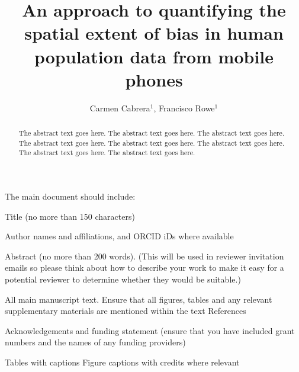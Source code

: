 \documentclass[]{rsos}%
\begin{document}
\title{An approach to quantifying the spatial extent of bias in human population data from mobile phones}

\author{
Carmen Cabrera$^{1}$,
Francisco Rowe$^{1}$}

\address{
  $^{1}$Geographic Data Science Lab, Department of Geography and Planning, University of Liverpool, Liverpool, United Kingdom.\\
  $^{}$}
\subject{
subject 1,
subject 2,
subject 3}



\begin{abstract}
The abstract text goes here. The abstract text goes here. The abstract text goes here. The abstract text goes here. The abstract text goes here. The abstract text goes here. The abstract text goes here. The abstract text goes here.
\end{abstract}

\providecommand{\EndFirstPage}{%
}

\maketitle

The main document should include:

Title (no more than 150 characters)

Author names and affiliations, and ORCID iDs where available

Abstract (no more than 200 words). (This will be used in reviewer
invitation emails so please think about how to describe your work to
make it easy for a potential reviewer to determine whether they would be
suitable.)

All main manuscript text. Ensure that all figures, tables and any
relevant supplementary materials are mentioned within the text
References

Acknowledgements and funding statement (ensure that you have included
grant numbers and the names of any funding providers)

Tables with captions Figure captions with credits where relevant
\end{document}

